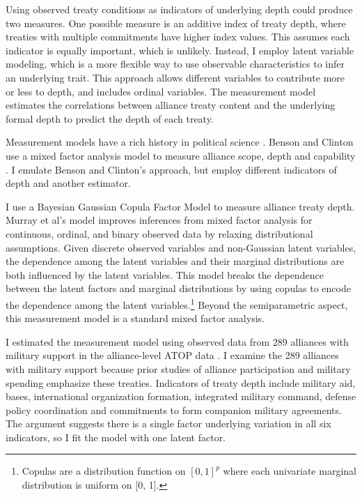 \documentclass[12pt]{article}
\begin{document}
Using observed treaty conditions as indicators of underlying depth could produce two measures. 
One possible measure is an additive index of treaty depth, where treaties with multiple commitments have higher index values. 
This assumes each indicator is equally important, which is unlikely. 
Instead, I employ latent variable modeling, which is a more flexible way to use observable characteristics to infer an underlying trait. 
This approach allows different variables to contribute more or less to depth, and includes ordinal variables.  
The measurement model estimates the correlations between alliance treaty content and the underlying formal depth to predict the depth of each treaty. 


Measurement models have a rich history in political science \citep{Clintonetal2004, TreierJackman2008, Fariss2014}.
Benson and Clinton use a mixed factor analysis model to measure alliance scope, depth and capability \citep{BensonClinton2016, Quinn2004}.  
I emulate Benson and Clinton's approach, but employ different indicators of depth and another estimator. 


I use a Bayesian Gaussian Copula Factor Model \citep{Murrayetal2013} to measure alliance treaty depth. 
Murray et al's model improves inferences from mixed factor analysis for continuous, ordinal, and binary observed data by relaxing distributional assumptions. 
Given discrete observed variables and non-Gaussian latent variables, the dependence among the latent variables and their marginal distributions are both influenced by the latent variables.
This model breaks the dependence between the latent factors and marginal distributions by using copulas to encode the dependence among the latent variables.\footnote{Copulas are a distribution function on $[0, 1]^p$ where each univariate marginal distribution is uniform on [0, 1].}
Beyond the semiparametric aspect, this measurement model is a standard mixed factor analysis.


I estimated the measurement model using observed data from 289 alliances with military support in the alliance-level ATOP data \citep{Leedsetal2002}. 
I examine the 289 alliances with military support because prior studies of alliance participation and military spending emphasize these treaties.
Indicators of treaty depth include military aid, bases, international organization formation, integrated military command, defense policy coordination and commitments to form companion military agreements. 
The argument suggests there is a single factor underlying variation in all six indicators, so I fit the model with one latent factor. 
\end{document}
